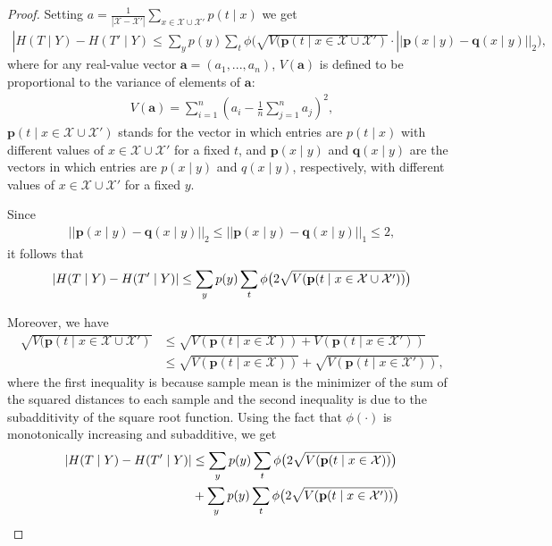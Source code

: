 \documentclass{article} \usepackage{iclr2021_conference,times}
\theoremstyle{definition}
\theoremstyle{remark}
\newcommand{\modified}[1]{{\color{black}{#1}}}
\begin{document}
\begin{proof}
Setting $a=\frac{1}{|\mathcal{X} - \mathcal{X'}|}\sum_{x \in \mathcal{X} \cup \mathcal{X'}} p(t \mid x)$ we get
\begin{align}
    |H(T \mid Y) - H(T' \mid Y) \le \sum_y p(y) \sum_t \phi\big(\sqrt{V(\mathbf{p}(t \mid x \in \mathcal{X} \cup \mathcal{X'})} \cdot ||\mathbf{p}(x \mid y) - \mathbf{q}(x \mid y)||_2\big),
\end{align}
where for any real-value vector $\mathbf{a} = (a_1,...,a_n)$, $V(\mathbf{a})$ is defined to be proportional to the variance of elements of $\mathbf{a}$:
\begin{align}
    V(\mathbf{a}) = \sum_{i=1}^n(a_i - \frac{1}{n} \sum_{j=1}^n a_j)^2,
\end{align}
$\mathbf{p}(t \mid x \in \mathcal{X} \cup \mathcal{X'})$ stands for the vector in which entries are $p(t \mid x)$ with different values of $x \in \mathcal{X} \cup \mathcal{X'}$ for a fixed $t$, and $\mathbf{p}(x \mid y)$ and $\mathbf{q}(x \mid y)$ are the vectors in which entries are $p(x \mid y)$ and $q(x \mid y)$, respectively, with different values of $x \in \mathcal{X} \cup \mathcal{X'}$ for a fixed $y$.

Since 
\begin{align}
    ||\mathbf{p}(x \mid y) - \mathbf{q}(x \mid y)||_2 \le ||\mathbf{p}(x \mid y) - \mathbf{q}(x \mid y)||_1 \le 2,
\end{align}
it follows that 
\begin{align}
    |\modified{H(T \mid Y)} - H(T' \mid Y) | \le \sum_y p(y) \sum_t \phi\big(2\sqrt{V(\mathbf{p}(t \mid x \in \mathcal{X} \cup \mathcal{X'}))}\big)
\end{align}

Moreover, we have 
\begin{align}
    \sqrt{V(\mathbf{p}(t \mid x \in \mathcal{X} \cup \mathcal{X'})} &\le \sqrt{V(\mathbf{p}(t \mid x \in \mathcal{X})) +   V(\mathbf{p}(t \mid x \in \mathcal{X'}))} \\
    &\le \sqrt{V(\mathbf{p}(t \mid x \in \mathcal{X}))} +  \sqrt{V(\mathbf{p}(t \mid x \in \mathcal{X'}))},
\end{align}
where the ﬁrst inequality is because sample mean is the minimizer of the sum of the squared distances to each sample and the second inequality is due to the subadditivity of the square root function.
Using the fact that $\phi(\cdot)$ is monotonically increasing and subadditive, we get
\begin{align}
    |\modified{H(T \mid Y)} - H(T' \mid Y) | &\le \sum_y p(y) \sum_t \phi \big( 2\sqrt{V(\mathbf{p}(t \mid x \in \mathcal{X}))} \big) \nonumber \\
    &+ \sum_y p(y) \sum_t \phi \big( 2\sqrt{V(\mathbf{p}(t \mid x \in \mathcal{X'}))} \big) 
    \label{eq:init1}
\end{align}


\end{proof}
\end{document}
